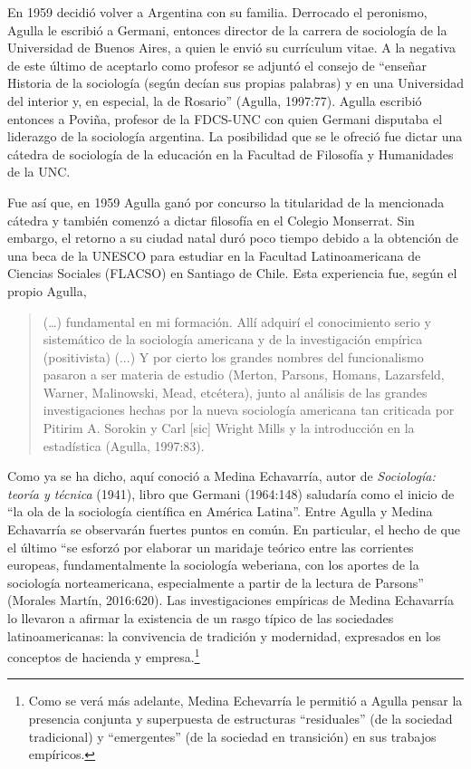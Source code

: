 En 1959 decidió volver a Argentina con su familia. Derrocado el peronismo, Agulla le escribió a Germani, entonces director de la carrera de sociología de la Universidad de Buenos Aires, a quien le envió su currículum vitae. A la negativa de este último de aceptarlo como profesor se adjuntó el consejo de ``enseñar Historia de la sociología (según decían sus propias palabras) y en una Universidad del interior y, en especial, la de Rosario'' (Agulla, 1997:77). Agulla escribió entonces a Poviña, profesor de la FDCS-UNC con quien Germani disputaba el liderazgo de la sociología argentina. La posibilidad que se le ofreció fue dictar una cátedra de sociología de la educación en la Facultad de Filosofía y Humanidades de la UNC.

Fue así que, en 1959 Agulla ganó por concurso la titularidad de la mencionada cátedra y también comenzó a dictar filosofía en el Colegio Monserrat. Sin embargo, el retorno a su ciudad natal duró poco tiempo debido a la obtención de una beca de la UNESCO para estudiar en la Facultad Latinoamericana de Ciencias Sociales (FLACSO) en Santiago de Chile. Esta experiencia fue, según el propio Agulla,

\begin{quote}
(\ldots) fundamental en mi formación. Allí adquirí el conocimiento serio y sistemático de la sociología americana y de la investigación empírica (positivista) (...) Y por cierto los grandes nombres del funcionalismo pasaron a ser materia de estudio (Merton, Parsons, Homans, Lazarsfeld, Warner, Malinowski, Mead, etcétera), junto al análisis de las grandes investigaciones hechas por la nueva sociología americana tan criticada por Pitirim A. Sorokin y Carl {[}sic{]} Wright Mills y la introducción en la estadística (Agulla, 1997:83).
\end{quote}

Como ya se ha dicho, aquí conoció a Medina Echavarría, autor de \emph{Sociología: teoría y técnica} (1941), libro que Germani (1964:148) saludaría como el inicio de ``la ola de la sociología científica en América Latina''. Entre Agulla y Medina Echavarría se observarán fuertes puntos en común. En particular, el hecho de que el último ``se esforzó por elaborar un maridaje teórico entre las corrientes europeas, fundamentalmente la sociología weberiana, con los aportes de la sociología norteamericana, especialmente a partir de la lectura de Parsons'' (Morales Martín, 2016:620). Las investigaciones empíricas de Medina Echavarría lo llevaron a afirmar la existencia de un rasgo típico de las sociedades latinoamericanas: la convivencia de tradición y modernidad, expresados en los conceptos de hacienda y empresa.\footnote{Como se verá más adelante, Medina Echevarría le permitió a Agulla pensar la presencia conjunta y superpuesta de estructuras ``residuales'' (de la sociedad tradicional) y ``emergentes'' (de la sociedad en transición) en sus trabajos empíricos.}

